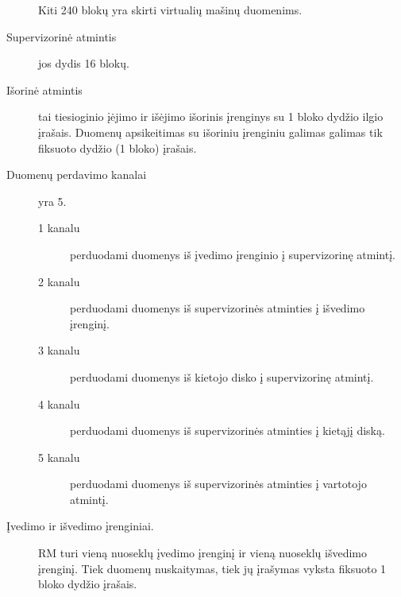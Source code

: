 \begin{description}
    Kiti 240 blokų yra skirti virtualių mašinų duomenims.
  \item[Supervizorinė atmintis] jos dydis 16 blokų.
  \item[Išorinė atmintis] tai tiesioginio įėjimo ir išėjimo išorinis
    įrenginys su 1 bloko dydžio ilgio įrašais. Duomenų apsikeitimas su 
    išoriniu įrenginiu galimas galimas tik fiksuoto dydžio (1 bloko)
    įrašais.
  \item[Duomenų perdavimo kanalai] yra 5. 
    \begin{description}
      \item[1 kanalu] perduodami duomenys iš įvedimo įrenginio į 
        supervizorinę atmintį.
      \item[2 kanalu] perduodami duomenys iš supervizorinės atminties
        į išvedimo įrenginį.
      \item[3 kanalu] perduodami duomenys iš kietojo disko į supervizorinę
        atmintį.
      \item[4 kanalu] perduodami duomenys iš supervizorinės atminties į 
        kietąjį diską.
      \item[5 kanalu] perduodami duomenys iš supervizorinės atminties į 
        vartotojo atmintį.
    \end{description}
  \item[Įvedimo ir išvedimo įrenginiai.] RM turi vieną nuoseklų įvedimo
    įrenginį ir vieną nuoseklų išvedimo įrenginį. Tiek duomenų nuskaitymas,
    tiek jų įrašymas vyksta fiksuoto 1 bloko dydžio įrašais.
\end{description}
